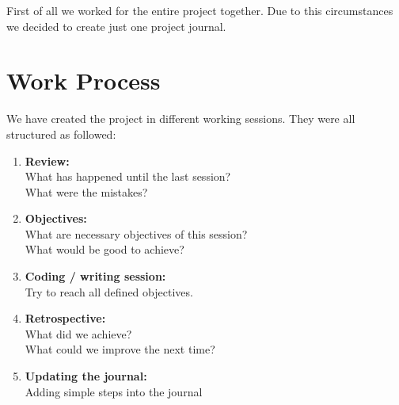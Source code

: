 %
%
%
%

\def\Title{Project Journal} %
\def\Author{Michael Gerber, Nicolas Ganz } %
\def\Date{\today}







\maketitle %

First of all we worked for the entire project together. Due to this circumstances we decided to create just one project journal.

\section*{Work Process}
We have created the project in different working sessions. They were all structured as followed:
\begin{enumerate}
  \item \textbf{Review:}\\
    What has happened until the last session?\\
    What were the mistakes?
  \item \textbf{Objectives:}\\
    What are necessary objectives of this session?\\
    What would be good to achieve?
  \item \textbf{Coding / writing session:}\\
    Try to reach all defined objectives.
  \item \textbf{Retrospective:}\\
    What did we achieve?\\
    What could we improve the next time?
  \item \textbf{Updating the journal:}\\
    Adding simple steps into the journal
\end{enumerate}

